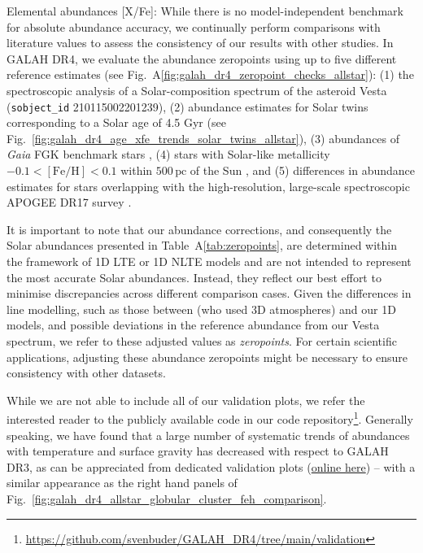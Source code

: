 \documentclass[
  journal=pasa,
  manuscript=research-paper, %
  year=2024,
  volume=37
]{cup-journal}
\newcommand{\Gaia}{\textit{Gaia}\xspace}
\begin{document}
Elemental abundances [X/Fe]: While there is no model-independent benchmark for absolute abundance accuracy, we continually perform comparisons with literature values to assess the consistency of our results with other studies. In GALAH DR4, we evaluate the abundance zeropoints using up to five different reference estimates (see Fig.~A\ref{fig:galah_dr4_zeropoint_checks_allstar}): (1) the spectroscopic analysis of a Solar-composition spectrum of the asteroid Vesta (\texttt{sobject\_id} 210115002201239), (2) abundance estimates for Solar twins corresponding to a Solar age of 4.5 Gyr (see Fig.~\ref{fig:galah_dr4_age_xfe_trends_solar_twins_allstar}), (3) abundances of \Gaia FGK benchmark stars \citep{Jofre2015, Jofre2018}, (4) stars with Solar-like metallicity $-0.1 < \mathrm{[Fe/H]} < 0.1$ within $500\,\mathrm{pc}$ of the Sun \citep[a method introduced by][]{Joensson2020}, and (5) differences in abundance estimates for stars overlapping with the high-resolution, large-scale spectroscopic APOGEE DR17 survey \citep{SDSSDR17}. 

It is important to note that our abundance corrections, and consequently the Solar abundances presented in Table~A\ref{tab:zeropoints}, are determined within the framework of 1D LTE or 1D NLTE models and are not intended to represent the most accurate Solar abundances. Instead, they reflect our best effort to minimise discrepancies across different comparison cases. Given the differences in line modelling, such as those between \citet{Grevesse2007} (who used 3D atmospheres) and our 1D models, and possible deviations in the reference abundance from our Vesta spectrum, we refer to these adjusted values as \textit{zeropoints}. For certain scientific applications, adjusting these abundance zeropoints might be necessary to ensure consistency with other datasets.

While we are not able to include all of our validation plots, we refer the interested reader to the publicly available code in our code repository\footnote{\url{https://github.com/svenbuder/GALAH_DR4/tree/main/validation}}. Generally speaking, we have found that a large number of systematic trends of abundances with temperature and surface gravity has decreased with respect to GALAH DR3, as can be appreciated from dedicated validation plots (\href{https://github.com/svenbuder/GALAH_DR4/blob/main/validation/galah_dr4_validation_globular_clusters.ipynb}{online here}) -- with a similar appearance as the right hand panels of Fig.~\ref{fig:galah_dr4_allstar_globular_cluster_feh_comparison}.
\end{document}
